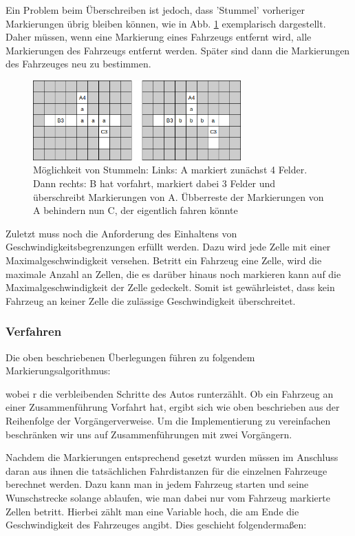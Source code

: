 \documentclass[10pt, a4paper]{article}
\begin{document}
Ein Problem beim Überschreiben ist jedoch, dass 'Stummel' vorheriger Markierungen übrig bleiben können, wie in Abb. \ref{fig:overwritingCanCauseStubs} exemplarisch dargestellt. Daher müssen, wenn eine Markierung eines Fahrzeugs entfernt wird, alle Markierungen des Fahrzeugs entfernt werden. Später sind dann die Markierungen des Fahrzeuges neu zu bestimmen.
\begin{figure}[h!]
	\centering
	\includegraphics[width=8cm]{img/stubs}
	\caption{Möglichkeit von Stummeln: Links: A markiert zunächst 4 Felder. Dann rechts: B hat vorfahrt, markiert dabei 3 Felder und überschreibt Markierungen von A. Übberreste der Markierungen von A behindern nun C, der eigentlich fahren könnte}
	\label{fig:overwritingCanCauseStubs}
\end{figure}

Zuletzt muss noch die Anforderung des Einhaltens von Geschwindigkeitsbegrenzungen erfüllt werden. Dazu wird jede Zelle mit einer Maximalgeschwindigkeit versehen. Betritt ein Fahrzeug eine Zelle, wird die maximale Anzahl an Zellen, die es darüber hinaus noch markieren kann auf die Maximalgeschwindigkeit der Zelle gedeckelt. Somit ist gewährleistet, dass kein Fahrzeug an keiner Zelle die zulässige Geschwindigkeit 
überschreitet.

\subsubsection{Verfahren}
\label{subsubsec:kreisverkehrUmsetzungVerfahren}

Die oben beschriebenen Überlegungen führen zu folgendem Markierungsalgorithmus:

wobei r die verbleibenden Schritte des Autos runterzählt. Ob ein Fahrzeug an einer Zusammenführung Vorfahrt hat, ergibt sich wie oben beschrieben aus der Reihenfolge der Vorgängerverweise. Um die Implementierung zu vereinfachen beschränken wir uns auf Zusammenführungen mit zwei Vorgängern.

Nachdem die Markierungen entsprechend gesetzt wurden müssen im Anschluss daran aus ihnen die tatsächlichen Fahrdistanzen für die einzelnen Fahrzeuge berechnet werden. Dazu kann man in jedem Fahrzeug starten und seine Wunschstrecke solange ablaufen, wie man dabei nur vom Fahrzeug markierte Zellen betritt. Hierbei zählt man eine Variable hoch, die am Ende die Geschwindigkeit des Fahrzeuges angibt. Dies geschieht folgendermaßen:\\
\end{document}
